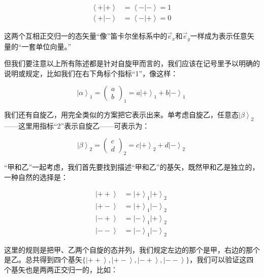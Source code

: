 \begin{align}
\left\langle + | + \right\rangle &= \left\langle - | - \right\rangle  = 1 \\
\left\langle + | - \right\rangle &= \left\langle - | + \right\rangle = 0~
\end{align}

这两个互相正交归一的态矢量“像”笛卡尔坐标系中的$\vec e_x$和$\vec e_y$一样成为表示任意矢量的“一套单位向量。”

但我们要注意以上所有陈述都是针对自旋甲而言的，我们应该在记号里予以明确的说明或规定，比如我们在右下角标个指标“1”，像这样：

\begin{equation}
\left| \alpha \right\rangle_1 = \left( \begin{array}{ccc} a \\ b \end{array} \right)_1 = a \left| + \right\rangle_1 + b \left| - \right\rangle_1~
\end{equation}

我们还有自旋乙，用完全类似的方案把它表示出来。单考虑自旋乙，任意态$\left| \beta \right\rangle_2$——这里用指标“2”表示自旋乙——可表示为：

\begin{equation}
\left| \beta \right\rangle_2 = \left( \begin{array}{ccc} c \\ d \end{array} \right)_2 = c \left| + \right\rangle_2 + d \left| - \right\rangle_2~
\end{equation}

“甲和乙”一起考虑，我们首先要找到描述“甲和乙”的基矢，既然甲和乙是独立的，一种自然的选择是：

\begin{align}
\left| ++ \right\rangle  &=  \left| + \right\rangle_1 \left| + \right\rangle_2\\
\left| +- \right\rangle  &=  \left| + \right\rangle_1 \left| - \right\rangle_2\\
\left| -+ \right\rangle  &=  \left| - \right\rangle_1 \left| + \right\rangle_2\\
\left| -- \right\rangle  &=  \left| - \right\rangle_1 \left| - \right\rangle_2 ~
\end{align}

这里的规则是把甲、乙两个自旋的态并列，我们规定左边的那个是甲，右边的那个是乙。总共得到四个基矢$\{ \left| ++ \right\rangle, \left| +- \right\rangle, \left| -+ \right\rangle, \left| - - \right\rangle \}$，我们可以验证这四个基矢也是两两正交归一的，比如：

